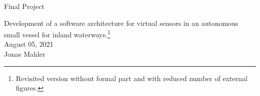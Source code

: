 %
\thispagestyle{empty}
\hypersetup{pageanchor=false}


%
\begin{center}
\vspace*{5cm} 
\Large
\textsf{Final Project}
\vspace*{1cm} 

\textsf{Development of a software architecture for virtual sensors in an autonomous small vessel for inland waterways.\footnote{Revisited version without formal part and with reduced number of external figures. }}\\

\normalsize
\vspace*{1cm} 
August 05, 2021\\ \vspace*{0.5cm} 
Jonas Mahler

\end{center}


